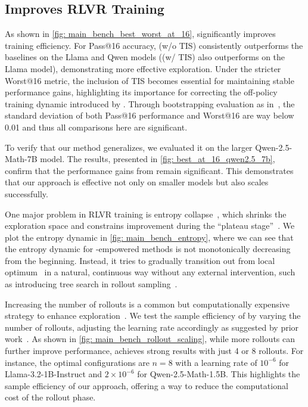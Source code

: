 \subsection{\alg Improves RLVR Training}

As shown in \cref{fig: main_bench_best_worst_at_16}, \alg significantly improves training efficiency. 
%
For Pass@16 accuracy, 
\alg (w/o TIS) consistently outperforms the baselines on the Llama and Qwen models (\alg (w/ TIS) also outperforms on the Llama model), demonstrating more effective exploration. 
%
Under the stricter Worst@16 metric, the inclusion of TIS becomes essential for maintaining stable performance gains, highlighting its importance for correcting the off-policy training dynamic introduced by \alg. 
%
Through bootstrapping evaluation as in~\citet{hochlehnert2025sober}, the standard deviation of both Pass@16 performance and Worst@16 are way below 0.01 and thus all comparisons here are significant.
%

To verify that our method generalizes, we evaluated it on the larger Qwen-2.5-Math-7B model. The results, presented in \cref{fig: best_at_16_qwen2.5_7b}, confirm that the performance gains from \alg remain significant. This demonstrates that our approach is effective not only on smaller models but also scales successfully.
%


One major problem in RLVR training is entropy collapse~\citep{cui2025entropy}, which shrinks the exploration space and constrains improvement during the ``plateau stage''~\citep{deng2025trial}.
%
We plot the entropy dynamic in \cref{fig: main_bench_entropy}, where we can see that the entropy dynamic for \alg-empowered methods is not monotonically decreasing from the beginning. 
%
Instead, it tries to gradually transition out from local optimum~\citep{kirkpatrick1983optimization, bertsimas1993simulated} in a natural, continuous way without any external intervention, such as introducing tree search in rollout sampling~\citep{li2025treepo}.
%

Increasing the number of rollouts is a common but computationally expensive strategy to enhance exploration~\citep{hou2025t1}. 
%
We test the sample efficiency of \alg by varying the number of rollouts, adjusting the learning rate accordingly as suggested by prior work~\citep{chen2025pass}. 
%
As shown in \cref{fig: main_bench_rollout_scaling}, while more rollouts can further improve performance, \alg achieves strong results with just 4 or 8 rollouts. 
%
For instance, the optimal configurations are $n=8$ with a learning rate of $10^{-6}$ for Llama-3.2-1B-Instruct and $2\times10^{-6}$ for Qwen-2.5-Math-1.5B. 
%
This highlights the sample efficiency of our approach, offering a way to reduce the computational cost of the rollout phase.
%



